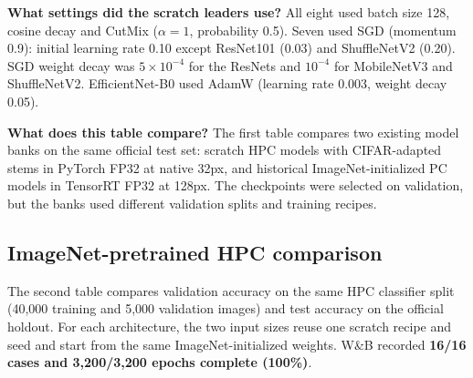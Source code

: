 \documentclass[10pt,a4paper]{article}
\begin{document}
\textbf{What settings did the scratch leaders use?}
All eight used batch size 128, cosine decay and CutMix ($\alpha=1$, probability 0.5). Seven used SGD (momentum 0.9): initial learning rate 0.10 except ResNet101 (0.03) and ShuffleNetV2 (0.20). SGD weight decay was $5\times10^{-4}$ for the ResNets and $10^{-4}$ for MobileNetV3 and ShuffleNetV2. EfficientNet-B0 used AdamW (learning rate 0.003, weight decay 0.05).

\textbf{What does this table compare?}
The first table compares two existing model banks on the same official test set: scratch HPC models with CIFAR-adapted stems in PyTorch FP32 at native 32px, and historical ImageNet-initialized PC models in TensorRT FP32 at 128px. The checkpoints were selected on validation, but the banks used different validation splits and training recipes.

\subsection*{ImageNet-pretrained HPC comparison}
The second table compares validation accuracy on the same HPC classifier split (40,000 training and 5,000 validation images) and test accuracy on the official holdout. For each architecture, the two input sizes reuse one scratch recipe and seed and start from the same ImageNet-initialized weights. W\&B recorded \textbf{16/16 cases and 3,200/3,200 epochs complete (100\%)}.
\end{document}
